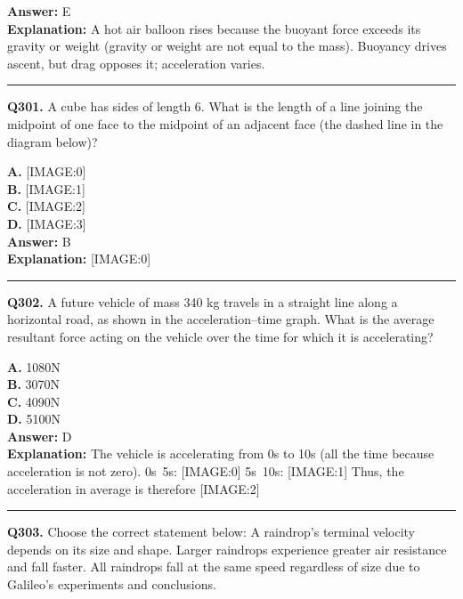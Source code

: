 \documentclass[12pt]{article}
\begin{document}
\textbf{Answer:} E \\
\textbf{Explanation:} A hot air balloon rises because the buoyant force exceeds its gravity or weight (gravity or weight are not equal to the mass). Buoyancy drives ascent, but drag opposes it; acceleration varies.

\hrule
\vspace{1em}


\noindent
\textbf{Q301.} A cube has sides of length 6. What is the length of a line joining the midpoint of one face to the midpoint of an adjacent face (the dashed line in the diagram below)?



\textbf{A.} [IMAGE:0] \\
\textbf{B.} [IMAGE:1] \\
\textbf{C.} [IMAGE:2] \\
\textbf{D.} [IMAGE:3] \\

\textbf{Answer:} B \\
\textbf{Explanation:} [IMAGE:0]

\hrule
\vspace{1em}


\noindent
\textbf{Q302.} A future vehicle of mass 340 kg travels in a straight line along a horizontal road, as shown in the acceleration–time graph.
What is the average resultant force acting on the vehicle over the time for which it is accelerating?



\textbf{A.} 1080N \\
\textbf{B.} 3070N \\
\textbf{C.} 4090N \\
\textbf{D.} 5100N \\

\textbf{Answer:} D \\
\textbf{Explanation:} The vehicle is accelerating from 0s to 10s (all the time because acceleration is not zero).
0s~5s:
[IMAGE:0]
5s~10s:
[IMAGE:1]
Thus, the acceleration in average is therefore
[IMAGE:2]

\hrule
\vspace{1em}


\noindent
\textbf{Q303.} Choose the correct statement below:
A raindrop’s terminal velocity depends on its size and shape.
Larger raindrops experience greater air resistance and fall faster.
All raindrops fall at the same speed regardless of size due to Galileo's experiments and conclusions.
\end{document}
